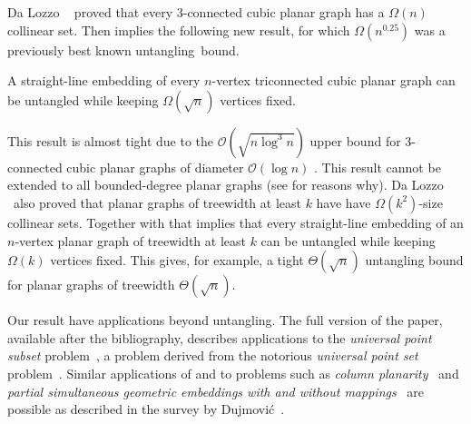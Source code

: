 Da Lozzo \etal~\cite{dalozzo.dujmovic.ea:drawing}  proved that every 3-connected cubic planar graph has
a $\Omega(n)$ collinear set. Then  implies the
following new result, for which $\Omega(n^{0.25})$ was a previously
  best known \mbox{untangling bound.} 

\begin{cor}
A straight-line embedding of every $n$-vertex triconnected cubic
planar graph can be untangled while 
keeping $\Omega(\sqrt{n})$ vertices fixed. 
\end{cor}

This result is almost tight due to the $\mathcal{O}(\sqrt{n\log^3n })$ upper bound for 3-connected cubic planar graphs of diameter $\mathcal{O}(\log n)$ \cite{c-upg-10}. This result cannot be extended to all bounded-degree planar graphs (see \cite{dujmovic:utility,DBLP:journals/dm/Owens81} for
reasons why).  Da Lozzo \etal\ also proved that planar graphs of treewidth at least
$k$ have  have $\Omega(k^2)$-size collinear sets. Together with
  that implies that 
%
every straight-line embedding of an $n$-vertex planar graph of treewidth
at least $k$ can be untangled while keeping $\Omega(k)$ vertices fixed. 
%
This gives, for example, a tight $\Theta(\sqrt{n})$
untangling bound for planar graphs of treewidth
$\Theta(\sqrt{n})$.  

Our result have applications beyond untangling. The full version of the paper, available after the bibliography, describes applications to the {\em universal point subset} problem~\cite{abehlmmo-ups-12,dalozzo.dujmovic.ea:drawing,dujmovic:utility}, a problem derived from the notorious {\em universal point set} problem~\cite{DBLP:journals/comgeo/Bose02,DBLP:conf/cccg/CastanedaU96,deFraysseix:1988:SSS:62212.62254, dFPP90, GMPP,DBLP:journals/ipl/Kurowski04, DBLP:journals/jgaa/BannisterCDE14}. Similar applications of  and  to problems such
as \emph{column planarity}~\cite{behks-cppsge-17,dalozzo.dujmovic.ea:drawing,dujmovic:utility}
and \emph{partial simultaneous geometric embeddings with and without
  mappings}~\cite{behks-cppsge-17,ddlmw-pqp-15,dujmovic:utility} are possible as described in the survey by Dujmovi\'c~\cite{dujmovic:utility}.


